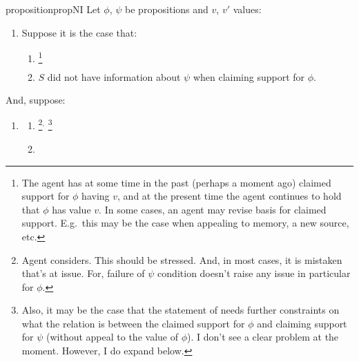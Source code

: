\begin{note}[\nI{}]

  \begin{restatable}[\nI{-}  --- \nI{}]{proposition}{propNI}\label{prem:ni}
    Let \(\phi\), \(\psi\) be propositions and \(v\), \(v'\) values:
    \begin{enumerate}[ref=\named{\nIacro{}:\arabic*}, series=nI_counter]
    \item\label{nI:claimed-support}
      Suppose it is the case that:
      \begin{enumerate}[label=\alph*., ref=\named{\nIacro{}1:\alph*}]
      \item \nIClauseClaimedSupport{}\nolinebreak
        \footnote{
          The agent has at some time in the past (perhaps a moment ago) claimed support for \(\phi\) having \(v\), and at the present time the agent continues to hold that \(\phi\) has value \(v\).
          In some cases, an agent may revise basis for claimed support.
          E.g.\ this may be the case when appealing to memory, a new source, etc.
        }
      \item\label{nI:psi-is-new} {\color{red} \(S\) did not have information about \(\psi\) when claiming support for \(\phi\).}
      \end{enumerate}
    \end{enumerate}
    And, suppose:
    \begin{enumerate}[ref=\named{\nIacro{}:\arabic*}, resume*=nI_counter]
    \item\label{nI:inclusion} \nIClauseInclusion{}
      \begin{enumerate}[label=\alph*., ref=\named{\nIacro{}2:\alph*}]
      \item\label{nI:inclusion:position} \nIClauseInclusionPosition{}\nolinebreak
        \footnote{
          Agent considers.
          This should be stressed.
          And, in most cases, it is mistaken that's at issue.
          For, failure of \(\psi\) condition doesn't raise any issue in particular for \(\phi\).
        }\(^{,}\)\nolinebreak
        \footnote{
          Also, it may be the case that the statement of \nI{} needs further constraints on what the relation is between the claimed support for \(\phi\) and claiming support for \(\psi\) (without appeal to the value of \(\phi\)).
          I don't see a clear problem at the moment.
          However, I do expand below.
        }
      \item\label{nI:inclusion:bound} \nIClauseInclusioBound{}

\end{enumerate}
\end{enumerate}
\end{restatable}
\end{note}
